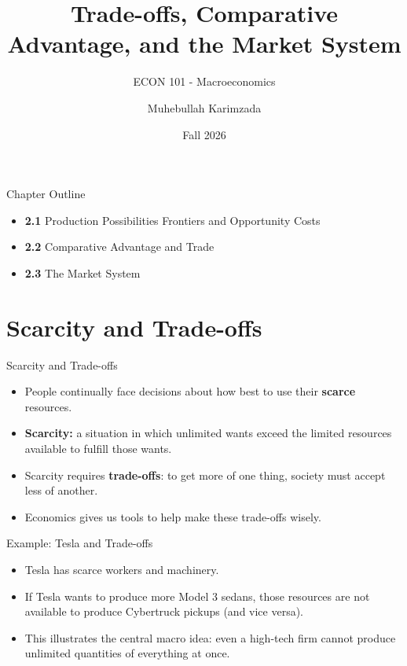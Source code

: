 \documentclass[aspectratio=169]{beamer}
\title{\textbf{Trade-offs, Comparative Advantage, and the Market System \vspace{.5cm}\\  }}
\subtitle{ {\large ECON 101 - Macroeconomics}}
\author{Muhebullah Karimzada}
\date{Fall 2026}
\begin{document}
\begin{frame}[plain]
  \titlepage
\end{frame}

\begin{frame}{Chapter Outline}
\transfade
\begin{itemize}[<+->]
  \item \textbf{2.1} Production Possibilities Frontiers and Opportunity Costs
  \item \textbf{2.2} Comparative Advantage and Trade
  \item \textbf{2.3} The Market System
\end{itemize}
\end{frame}

\section{Scarcity and Trade-offs}

\begin{frame}{Scarcity and Trade-offs}
\transfade
\begin{itemize}[<+->]
  \item People continually face decisions about how best to use their \textbf{scarce} resources.
  \item \textbf{Scarcity:} a situation in which unlimited wants exceed the limited resources available to fulfill those wants.
  \item Scarcity requires \textbf{trade-offs}: to get more of one thing, society must accept less of another.
  \item Economics gives us tools to help make these trade-offs wisely.
\end{itemize}
\end{frame}

\begin{frame}{Example: Tesla and Trade-offs}
\transfade
\begin{itemize}[<+->]
  \item Tesla has scarce workers and machinery.
  \item If Tesla wants to produce more Model 3 sedans, those resources are not available to produce Cybertruck pickups (and vice versa).
  \item This illustrates the central macro idea: even a high-tech firm cannot produce unlimited quantities of everything at once.
\end{itemize}
\end{frame}
\end{document}
